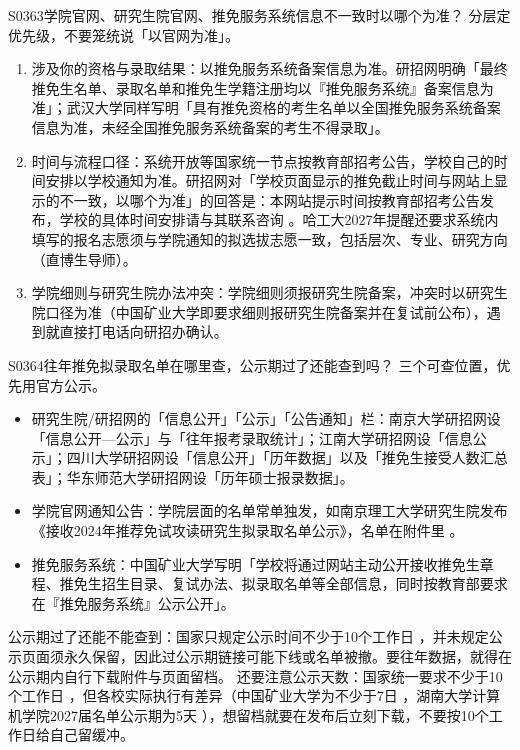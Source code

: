 \begin{qa}{S0363}{学院官网、研究生院官网、推免服务系统信息不一致时以哪个为准？}
分层定优先级，不要笼统说「以官网为准」。
\begin{enumerate}
  \item 涉及你的资格与录取结果：以推免服务系统备案信息为准。研招网明确「最终推免生名单、录取名单和推免生学籍注册均以『推免服务系统』备案信息为准」；武汉大学同样写明「具有推免资格的考生名单以全国推免服务系统备案信息为准，未经全国推免服务系统备案的考生不得录取」。
  \item 时间与流程口径：系统开放等国家统一节点按教育部招考公告，学校自己的时间安排以学校通知为准。研招网对「学校页面显示的推免截止时间与网站上显示的不一致，以哪个为准」的回答是：本网站提示时间按教育部招考公告发布，学校的具体时间安排请与其联系咨询 。哈工大2027年提醒还要求系统内填写的报名志愿须与学院通知的拟选拔志愿一致，包括层次、专业、研究方向（直博生导师）。
  \item 学院细则与研究生院办法冲突：学院细则须报研究生院备案，冲突时以研究生院口径为准（中国矿业大学即要求细则报研究生院备案并在复试前公布），遇到就直接打电话向研招办确认。
\end{enumerate}
\end{qa}

\begin{qa}{S0364}{往年推免拟录取名单在哪里查，公示期过了还能查到吗？}
三个可查位置，优先用官方公示。
\begin{itemize}
  \item 研究生院/研招网的「信息公开」「公示」「公告通知」栏：南京大学研招网设「信息公开—公示」与「往年报考录取统计」；江南大学研招网设「信息公示」；四川大学研招网设「信息公开」「历年数据」以及「推免生接受人数汇总表」；华东师范大学研招网设「历年硕士报录数据」。
  \item 学院官网通知公告：学院层面的名单常单独发，如南京理工大学研究生院发布《接收2024年推荐免试攻读研究生拟录取名单公示》，名单在附件里 。
  \item 推免服务系统：中国矿业大学写明「学校将通过网站主动公开接收推免生章程、推免生招生目录、复试办法、拟录取名单等全部信息，同时按教育部要求在『推免服务系统』公示公开」。
\end{itemize}
公示期过了还能不能查到：国家只规定公示时间不少于10个工作日 ，并未规定公示页面须永久保留，因此过公示期链接可能下线或名单被撤。要往年数据，就得在公示期内自行下载附件与页面留档。 还要注意公示天数：国家统一要求不少于10个工作日 ，但各校实际执行有差异（中国矿业大学为不少于7日 ，湖南大学计算机学院2027届名单公示期为5天 ），想留档就要在发布后立刻下载，不要按10个工作日给自己留缓冲。
\end{qa}

